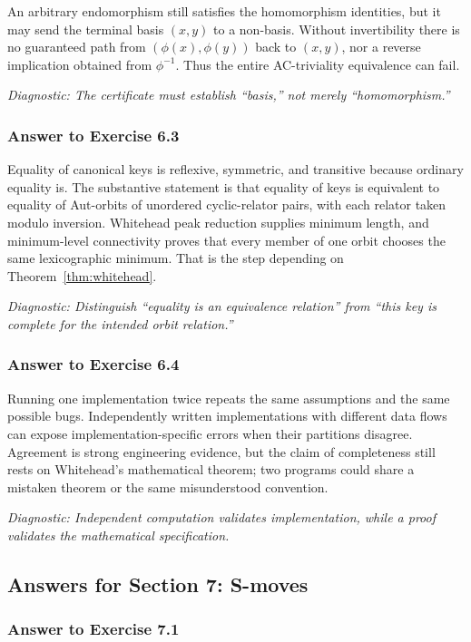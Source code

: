 \documentclass[11pt]{article}
\theoremstyle{definition}
\theoremstyle{remark}
\newcommand{\diagnostic}[1]{\par\smallskip\textit{Diagnostic: #1}}
\begin{document}
An arbitrary endomorphism still satisfies the homomorphism identities, but
it may send the terminal basis \((x,y)\) to a non-basis.  Without
invertibility there is no guaranteed path from
\((\phi(x),\phi(y))\) back to \((x,y)\), nor a reverse implication obtained
from \(\phi^{-1}\).  Thus the entire AC-triviality equivalence can fail.

\diagnostic{The certificate must establish ``basis,'' not merely
``homomorphism.''}

\subsubsection*{Answer to Exercise 6.3}

Equality of canonical keys is reflexive, symmetric, and transitive because
ordinary equality is.  The substantive statement is that equality of keys
is equivalent to equality of Aut-orbits of unordered cyclic-relator pairs,
with each relator taken modulo inversion.  Whitehead peak reduction supplies
minimum length, and minimum-level connectivity proves that every member of
one orbit chooses the same lexicographic minimum.  That is the step depending
on Theorem~\ref{thm:whitehead}.

\diagnostic{Distinguish ``equality is an equivalence relation'' from
``this key is complete for the intended orbit relation.''}

\subsubsection*{Answer to Exercise 6.4}

Running one implementation twice repeats the same assumptions and the same
possible bugs.  Independently written implementations with different data
flows can expose implementation-specific errors when their partitions
disagree.  Agreement is strong engineering evidence, but the claim of
completeness still rests on Whitehead's mathematical theorem; two programs
could share a mistaken theorem or the same misunderstood convention.

\diagnostic{Independent computation validates implementation, while a
proof validates the mathematical specification.}

\subsection*{Answers for Section 7: S-moves}

\subsubsection*{Answer to Exercise 7.1}
\end{document}
